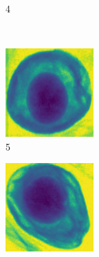 \documentclass[11pt]{article}
\begin{document}
\begin{figure}[!h]
\begin{subfigure}[b]{0.22\textwidth}
         \caption{4}
         \label{fig:avo_3}
     \end{subfigure}
     \\
    \begin{subfigure}[b]{0.22\textwidth}
         \centering
         \includegraphics[width=\textwidth]{figurer/avocado_dataset/avo_4.jpg}
         \caption{5}
         \label{fig:avo_4}
     \end{subfigure}
     \hfill
     \begin{subfigure}[b]{0.22\textwidth}
         \centering
         \includegraphics[width=\textwidth]{figurer/avocado_dataset/avo_5.jpg}

\end{subfigure}
\end{figure}
\end{document}
